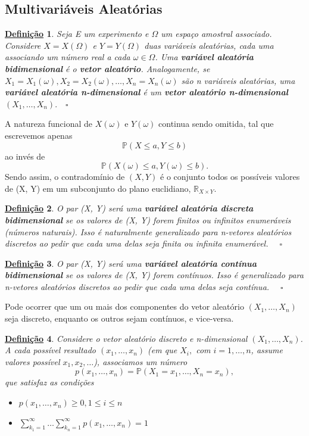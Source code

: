 \documentclass{article}
\newtheorem*{def*}{\underline{Defini\c c\~ao}}
\begin{document}
\subsection{Multivariáveis Aleatórias}
\begin{def*}
  Seja E um experimento e \(\Omega \) um espaço amostral associado. Considere \(X = X(\Omega )\) e \(Y = Y(\Omega )\) duas variáveis aleatórias,
  cada uma associando um número real a cada \(\omega \in \Omega \). Uma \textbf{variável aleatória bidimensional} é o \textbf{vetor aleatório}.
  Analogamente, se \(X_{1} = X_{1}(\omega ), X_{2} = X_{2}(\omega ), \dotsc , X_{n} = X_{n}(\omega )\) são n variáveis aleatórias, uma \textbf{variável aleatória n-dimensional}
  é um \textbf{vetor aleatório n-dimensional} \((X_{1}, \dotsc , X_{n}). \quad \square\)
\end{def*}
A natureza funcional de \(X(\omega )\) e \(Y(\omega )\) continua sendo omitida, tal que escrevemos apenas 
\[
  \mathbb{P}(X \leq a, Y\leq b)
\]
ao invés de 
\[
  \mathbb{P}(X(\omega )\leq a, Y(\omega )\leq b).
\]
Sendo assim, o contradomínio de \((X, Y)\) é o conjunto todos os possíveis valores de (X, Y) em um subconjunto do plano euclidiano, \(\mathbb{R}_{X\times Y}\).
\begin{def*}
  O par (X, Y) será uma \textbf{variável aleatória discreta bidimensional} se os valores de (X, Y) forem finitos ou infinitos enumeráveis (números naturais). Isso é naturalmente generalizado para n-vetores
  aleatórios discretos ao pedir que cada uma delas seja finita ou infinita enumerável. \(\quad \square\)
\end{def*}
\begin{def*}
  O par (X, Y) será uma \textbf{variável aleatória contínua bidimensional} se os valores de (X, Y) forem contínuos. Isso é generalizado para n-vetores
  aleatórios discretos ao pedir que cada uma delas seja contínua. \(\quad \square\)
\end{def*}
Pode ocorrer que um ou mais dos componentes do vetor aleatório \((X_{1}, \dotsc , X_{n})\) seja discreto, enquanto os outros sejam contínuos, e vice-versa.
\begin{def*}
  Considere o vetor aleatório discreto e n-dimensional \((X_{1}, \dotsc , X_{n})\). A cada possível resultado \((x_{1}, \dotsc , x_{n})\) (em que \(X_{i},\) com \(i=1, \dotsc , n\), assume valores possível \(x_{1}, x_{2}, \dotsc \)), associamos um número 
  \[
    p(x_{1}, \dotsc , x_{n}) = \mathbb{P}(X_{1} = x_{1}, \dotsc , X_{n}=x_{n}),
  \]
  que satisfaz as condições 
  \begin{itemize}
    \item[i)] \(p(x_{1}, \dotsc , x_{n}) \geq 0, 1 \leq i \leq n\)
    \item[ii)] \(\sum\limits_{k_{1} = 1}^{\infty}\dotsc \sum\limits_{k_{n}=1}^{\infty}p(x_{1}, \dotsc , x_{n}) = 1\)
  \end{itemize}
\end{def*}
\end{document}
